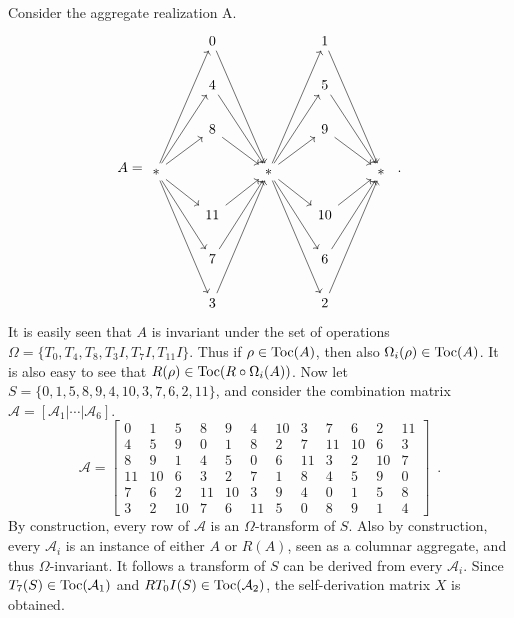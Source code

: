 \begin{example}
    \label{ex:stingray}
    Consider the aggregate realization A.
    \begin{equation}
        A = \begin{tikzcd}
            & 0 \arrow[dddr] && 1 \arrow[dddr] & \\
            & 4 \arrow[ddr] && 5 \arrow[ddr] & \\
            & 8 \arrow[dr] && 9 \arrow[dr] & \\
            * \arrow[ur] \arrow[uur] \arrow[uuur] \arrow[dr] \arrow[ddr] \arrow[dddr] && * \arrow[ur] \arrow[uur] \arrow[uuur] \arrow[dr] \arrow[ddr] \arrow[dddr] && * \\
            & 11 \arrow[ur] && 10 \arrow[ur] & \\
            & 7 \arrow[uur] && 6 \arrow[uur] & \\
            & 3 \arrow[uuur] && 2 \arrow[uuur] &
        \end{tikzcd} \enspace.
    \end{equation}
    It is easily seen that $A$ is invariant under the set of operations $\Omega = \{ T_0, T_4, T_8, T_3I, T_7I, T_{11}I \}$. Thus if $\rho \in \operatorname{Toc}(A)$, then also $\Omega_i(\rho) \in \operatorname{Toc}(A)$. It is also easy to see that $R(\rho) \in \operatorname{Toc}(R \circ \Omega_i(A))$. Now let $S = \{ 0, 1, 5, 8, 9, 4, 10, 3, 7, 6, 2, 11 \}$, and consider the combination matrix $\mathcal{A} = [\mathcal{A}_1 | \cdots | \mathcal{A}_6]$.
    \begin{equation}
        \mathcal{A} = \left[
        \begin{array}{cc|cc|cc|cc|cc|cc}
            0 & 1 & 5 & 8 & 9 & 4 & 10 & 3 & 7 & 6 & 2 & 11 \\
            4 & 5 & 9 & 0 & 1 & 8 & 2 & 7 & 11 & 10 & 6 & 3 \\
            8 & 9 & 1 & 4 & 5 & 0 & 6 & 11 & 3 & 2 & 10 & 7 \\
            11 & 10 & 6 & 3 & 2 & 7 & 1 & 8 & 4 & 5 & 9 & 0 \\
            7 & 6 & 2 & 11 & 10 & 3 & 9 & 4 & 0 & 1 & 5 & 8 \\
            3 & 2 & 10 & 7 & 6 & 11 & 5 & 0 & 8 & 9 & 1 & 4
        \end{array}
        \right] \enspace.
    \end{equation}
    By construction, every row of $\mathcal{A}$ is an $\Omega$-transform of $S$. Also by construction, every $\mathcal{A}_i$ is an instance of either $A$ or $R(A)$, seen as a columnar aggregate, and thus $\Omega$-invariant. It follows a transform of $S$ can be derived from every $\mathcal{A}_i$. Since $T_7(S) \in \operatorname{Toc}(\mathcal{A}_1)$ and $RT_0I(S) \in \operatorname{Toc}(\mathcal{A}_2)$, the self-derivation matrix $X$ is obtained.

\end{example}
